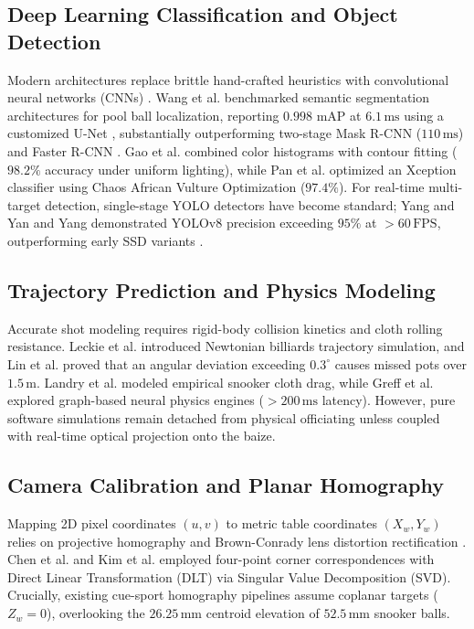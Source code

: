 \documentclass[conference]{IEEEtran}
\begin{document}
\subsection{Deep Learning Classification and Object Detection}
Modern architectures replace brittle hand-crafted heuristics with convolutional neural networks (CNNs) \cite{ref38}. Wang et al. \cite{ref1} benchmarked semantic segmentation architectures for pool ball localization, reporting $0.998$ mAP at $6.1\,\text{ms}$ using a customized U-Net \cite{ref30}, substantially outperforming two-stage Mask R-CNN \cite{ref29} ($110\,\text{ms}$) and Faster R-CNN \cite{ref33}. Gao et al. \cite{ref2} combined color histograms with contour fitting ($98.2\%$ accuracy under uniform lighting), while Pan et al. \cite{ref3} optimized an Xception classifier using Chaos African Vulture Optimization ($97.4\%$). For real-time multi-target detection, single-stage YOLO detectors \cite{ref31, ref32} have become standard; Yang and Yan \cite{ref11} and Yang \cite{ref12} demonstrated YOLOv8 precision exceeding $95\%$ at $>60\,\text{FPS}$, outperforming early SSD variants \cite{ref34}.

\subsection{Trajectory Prediction and Physics Modeling}
Accurate shot modeling requires rigid-body collision kinetics and cloth rolling resistance. Leckie et al. \cite{ref6} introduced Newtonian billiards trajectory simulation, and Lin et al. \cite{ref10} proved that an angular deviation exceeding $0.3^\circ$ causes missed pots over $1.5\,\text{m}$. Landry et al. \cite{ref27} modeled empirical snooker cloth drag, while Greff et al. \cite{ref20} explored graph-based neural physics engines ($>200\,\text{ms}$ latency). However, pure software simulations remain detached from physical officiating unless coupled with real-time optical projection onto the baize.

\subsection{Camera Calibration and Planar Homography}
Mapping 2D pixel coordinates $(u, v)$ to metric table coordinates $(X_w, Y_w)$ relies on projective homography \cite{ref19} and Brown-Conrady lens distortion rectification \cite{ref35}. Chen et al. \cite{ref7} and Kim et al. \cite{ref13} employed four-point corner correspondences with Direct Linear Transformation (DLT) via Singular Value Decomposition (SVD). Crucially, existing cue-sport homography pipelines assume coplanar targets ($Z_w = 0$), overlooking the $26.25\,\text{mm}$ centroid elevation of $52.5\,\text{mm}$ snooker balls.
\end{document}
